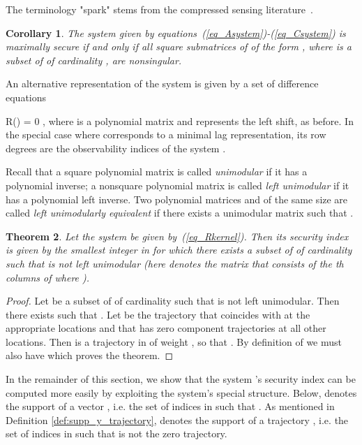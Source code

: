 \documentclass[letterpaper, 10 pt, conference]{ieeeconf}
\newcommand{\ybold}{\mathbf{y}}
\newcommand{\beq}{}
\newtheorem{thm}{Theorem}[section]
\newtheorem{cor}[thm]{Corollary}
\begin{document}
The terminology "spark" stems from the compressed sensing literature~\cite{TillmannP14}.

\begin{cor}
The system  given by equations~(\ref{eq_Asystem})-(\ref{eq_Csystem}) is maximally secure if and only if all square  submatrices of  of the form , where  is a subset of  of cardinality , are nonsingular.
\end{cor}

An alternative representation of the system  is given by a set of  difference equations
\beq
R(\sigma ) \ybold = 0 ,\label{eq_Rkernel}
\eeq
where  is a  polynomial matrix and  represents the left shift, as before.
In the special case where  corresponds to a minimal lag representation, its  row degrees are the observability indices of the system . 

Recall that a square polynomial matrix is called {\em unimodular} if it has a polynomial inverse; a nonsquare polynomial matrix is called {\em left unimodular} if it has a polynomial left inverse. Two polynomial matrices  and  of the same size are called {\em left unimodularly equivalent} if there exists a unimodular matrix  such that .

\begin{thm}\label{thm_RJ}
Let the system  be given by~(\ref{eq_Rkernel}). Then its security index  is given by the smallest integer  in  for which there exists a subset  of  of cardinality  such that  is not left unimodular (here  denotes the matrix that consists of the th columns of  where ).
\end{thm}
\begin{proof}
		Let  be a subset of  of cardinality  such that  is not left unimodular. Then there exists  such that . Let  be the trajectory that coincides with  at the appropriate locations and that has zero component trajectories at all other locations. Then  is a trajectory in  of weight , so that . By definition of  we must also have  which proves the theorem.
\end{proof}

In the remainder of this section, we show that the system 's security index  can be computed more easily by exploiting the system's special structure. Below,  denotes the support of a vector , i.e. the set of indices  in  such that . As mentioned in Definition \ref{def:supp_y_trajectory},  denotes the support of a trajectory , i.e. the set of indices  in  such that  is not the zero trajectory. 
\end{document}
